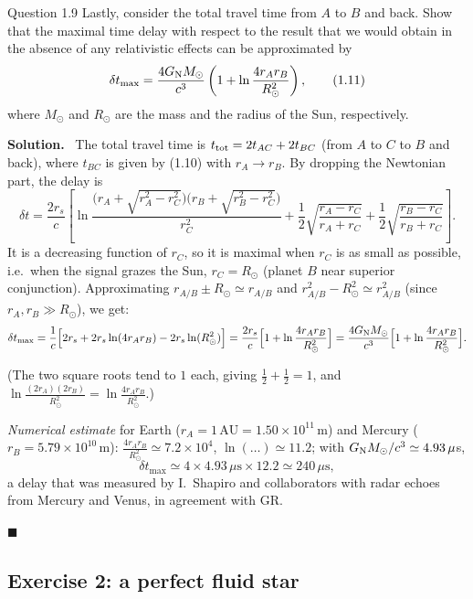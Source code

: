 \documentclass[11pt,a4paper]{article}
\numberwithin{equation}{subsection}
\newenvironment{solution}{\par\noindent\textbf{\textcolor{excol!70!black}{Solution.}}\ }{\hfill$\blacksquare$\par\medskip}
\newcommand{\added}[1]{{\color{teal!60!black}#1}}
\begin{document}
\begin{problem}{Question 1.9}
Lastly, consider the total travel time from $A$ to $B$ and back. Show that the maximal time delay with respect to the result that we would obtain in the absence of any relativistic effects can be approximated by
\[
  \delta t_{\max}=\frac{4G_{\mathrm N} M_\odot}{c^3}\left(1+\ln\frac{4r_Ar_B}{R_\odot^2}\right), \tag{1.11}
\]
where $M_\odot$ and $R_\odot$ are the mass and the radius of the Sun, respectively.
\end{problem}
\begin{solution}
The total travel time is $t_{\rm tot}=2t_{AC}+2t_{BC}$ (from $A$ to $C$ to $B$ and back), where $t_{BC}$ is given by (1.10) with $r_A\to r_B$. By dropping the Newtonian part, the delay is
\[
  \delta t=\frac{2r_s}{c}\left[\ln\frac{\big(r_A+\sqrt{r_A^2-r_C^2}\big)\big(r_B+\sqrt{r_B^2-r_C^2}\big)}{r_C^2}+\frac12\sqrt{\frac{r_A-r_C}{r_A+r_C}}+\frac12\sqrt{\frac{r_B-r_C}{r_B+r_C}}\right].
\]
It is a decreasing function of $r_C$, so it is maximal when $r_C$ is as small as possible, i.e.\ when the signal grazes the Sun, $r_C=R_\odot$ (planet $B$ near superior conjunction). Approximating $r_{A/B}\pm R_\odot\simeq r_{A/B}$ and $r_{A/B}^2-R_\odot^2\simeq r_{A/B}^2$ (since $r_A,r_B\gg R_\odot$), we get:
\[
  \delta t_{\max}=\frac1c\Big[2r_s+2r_s\ln(4r_Ar_B)-2r_s\ln(R_\odot^2)\Big]=\frac{2r_s}{c}\Big[1+\ln\frac{4r_Ar_B}{R_\odot^2}\Big]=\frac{4G_{\mathrm N} M_\odot}{c^3}\Big[1+\ln\frac{4r_Ar_B}{R_\odot^2}\Big].
\]
\added{(The two square roots tend to $1$ each, giving $\frac12+\frac12=1$, and $\ln\frac{(2r_A)(2r_B)}{R_\odot^2}=\ln\frac{4r_Ar_B}{R_\odot^2}$.)

\textit{Numerical estimate} for Earth ($r_A=1\,\mathrm{AU}=1.50\times10^{11}$\,m) and Mercury ($r_B=5.79\times10^{10}$\,m): $\frac{4r_Ar_B}{R_\odot^2}\simeq7.2\times10^4$, $\ln(\dots)\simeq11.2$; with $G_{\mathrm N} M_\odot/c^3\simeq4.93\,\mu$s,
\[
  \delta t_{\max}\simeq4\times4.93\,\mu\mathrm s\times12.2\simeq240\,\mu\mathrm s ,
\]
a delay that was measured by I.~Shapiro and collaborators with radar echoes from Mercury and Venus, in agreement with GR.}
\end{solution}

\subsection{Exercise 2: a perfect fluid star}
\end{document}
